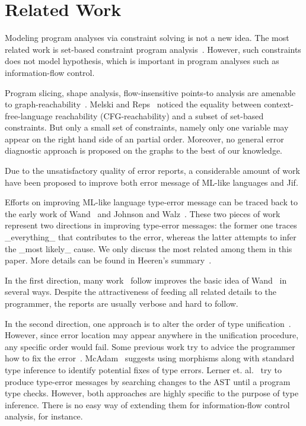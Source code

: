 \section{Related Work}

Modeling program analyses via constraint solving is not a new idea. The most
related work is set-based constraint program
analysis~\cite{aiken-setconstraint, aiken-typeinclusion}.  However, such
constraints does not model hypothesis, which is important in program analyses
such as information-flow control.
 
Program slicing, shape analysis, flow-insensitive points-to analysis are
amenable to graph-reachability~\cite{reps-graph}. Melski and
Reps~\cite{melski-cflgraph} noticed the equality between context-free-language
reachability (CFG-reachability) and a subset of set-based constraints. But only
a small set of constraints, namely only one variable may appear on the right
hand side of an partial order. Moreover, no general error diagnostic approach
is proposed on the graphs to the best of our knowledge. 

Due to the unsatisfactory quality of error reports, a considerable amount of
work have been proposed to improve both error message of ML-like languages and
Jif.

Efforts on improving ML-like language type-error message can be traced back to
the early work of Wand~\cite{wand-errorfinding} and Johnson and
Walz~\cite{johnson-popl86}. These two pieces of work represent two directions
in improving type-error messages: the former one traces _everything_ that
contributes to the error, whereas the latter attempts to infer the _most
likely_ cause. We only discuss the most related among them in this paper. More
details can be found in Heeren's summary~\cite{heeren:thesis}.

In the first direction, many work~\cite{choppella95, haack:slicing,
tip:slicing} follow improves the basic idea of Wand~\cite{wand-errorfinding} in
several ways. Despite the attractiveness of feeding all related details to the
programmer, the reports are usually verbose and hard to follow.

In the second direction, one approach is to alter the order of type
unification~\cite{lee:toplas, mcadam:unification}. However, since error
location may appear anywhere in the unification procedure, any specific order
would fail. Some previous work try to advice the programmer how to fix the
error~\cite{mcadam:thesis, lerner:pldi07}. McAdam~\cite{mcadam:thesis} suggests
using morphisms along with standard type inference to identify potential fixes
of type errors. Lerner et. al.~\cite{lerner:pldi07} try to produce type-error
messages by searching changes to the AST until a program type checks. However,
both approaches are highly specific to the purpose of type inference. There is
no easy way of extending them for information-flow control analysis, for
instance.

